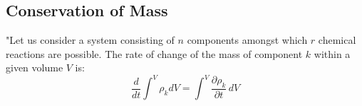 \subsection{Conservation of Mass}

"Let us consider a system consisting of $n$ components amongst which $r$ chemical reactions are possible. 
The rate of change of the mass of component $k$ within a given volume $V$ is:
\begin{equation}
\frac{d}{dt}\int^V \rho_k dV = \int^V \frac{\partial \rho_k}{\partial t}\, dV
\end{equation}